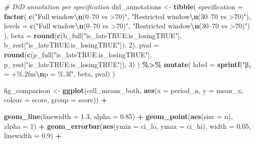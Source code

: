 \documentclass[
]{article}
\newenvironment{Shaded}{\begin{snugshade}}{\end{snugshade}}
\newcommand{\AttributeTok}[1]{\textcolor[rgb]{0.13,0.29,0.53}{#1}}
\newcommand{\CommentTok}[1]{\textcolor[rgb]{0.56,0.35,0.01}{\textit{#1}}}
\newcommand{\DecValTok}[1]{\textcolor[rgb]{0.00,0.00,0.81}{#1}}
\newcommand{\FloatTok}[1]{\textcolor[rgb]{0.00,0.00,0.81}{#1}}
\newcommand{\FunctionTok}[1]{\textcolor[rgb]{0.13,0.29,0.53}{\textbf{#1}}}
\newcommand{\NormalTok}[1]{#1}
\newcommand{\OtherTok}[1]{\textcolor[rgb]{0.56,0.35,0.01}{#1}}
\newcommand{\SpecialCharTok}[1]{\textcolor[rgb]{0.81,0.36,0.00}{\textbf{#1}}}
\newcommand{\StringTok}[1]{\textcolor[rgb]{0.31,0.60,0.02}{#1}}
\begin{document}
\begin{Shaded}
\begin{Highlighting}[]
\CommentTok{\# DiD annotation per specification}
\NormalTok{did\_annotations }\OtherTok{\textless{}{-}} \FunctionTok{tibble}\NormalTok{(}
  \AttributeTok{specification =} \FunctionTok{factor}\NormalTok{(}
    \FunctionTok{c}\NormalTok{(}\StringTok{"Full window}\SpecialCharTok{\textbackslash{}n}\StringTok{(0–70\textquotesingle{} vs \textgreater{}70\textquotesingle{})"}\NormalTok{, }\StringTok{"Restricted window}\SpecialCharTok{\textbackslash{}n}\StringTok{(30–70\textquotesingle{} vs \textgreater{}70\textquotesingle{})"}\NormalTok{),}
    \AttributeTok{levels =} \FunctionTok{c}\NormalTok{(}\StringTok{"Full window}\SpecialCharTok{\textbackslash{}n}\StringTok{(0–70\textquotesingle{} vs \textgreater{}70\textquotesingle{})"}\NormalTok{, }\StringTok{"Restricted window}\SpecialCharTok{\textbackslash{}n}\StringTok{(30–70\textquotesingle{} vs \textgreater{}70\textquotesingle{})"}\NormalTok{)}
\NormalTok{  ),}
  \AttributeTok{beta  =} \FunctionTok{round}\NormalTok{(}\FunctionTok{c}\NormalTok{(b\_full[}\StringTok{"is\_lateTRUE:is\_losingTRUE"}\NormalTok{],}
\NormalTok{                  b\_rest[}\StringTok{"is\_lateTRUE:is\_losingTRUE"}\NormalTok{]), }\DecValTok{2}\NormalTok{),}
  \AttributeTok{pval  =} \FunctionTok{round}\NormalTok{(}\FunctionTok{c}\NormalTok{(p\_full[}\StringTok{"is\_lateTRUE:is\_losingTRUE"}\NormalTok{],}
\NormalTok{                  p\_rest[}\StringTok{"is\_lateTRUE:is\_losingTRUE"}\NormalTok{]), }\DecValTok{3}\NormalTok{)}
\NormalTok{) }\SpecialCharTok{\%\textgreater{}\%}
  \FunctionTok{mutate}\NormalTok{(}
    \AttributeTok{label =} \FunctionTok{sprintf}\NormalTok{(}\StringTok{"β₃ = +\%.2fm}\SpecialCharTok{\textbackslash{}n}\StringTok{p = \%.3f"}\NormalTok{, beta, pval)}
\NormalTok{  )}

\NormalTok{fig\_comparison }\OtherTok{\textless{}{-}} \FunctionTok{ggplot}\NormalTok{(cell\_means\_both,}
       \FunctionTok{aes}\NormalTok{(}\AttributeTok{x =}\NormalTok{ period\_n, }\AttributeTok{y =}\NormalTok{ mean\_x,}
           \AttributeTok{colour =}\NormalTok{ score, }\AttributeTok{group =}\NormalTok{ score)) }\SpecialCharTok{+}

  \FunctionTok{geom\_line}\NormalTok{(}\AttributeTok{linewidth =} \FloatTok{1.3}\NormalTok{, }\AttributeTok{alpha =} \FloatTok{0.85}\NormalTok{) }\SpecialCharTok{+}
  \FunctionTok{geom\_point}\NormalTok{(}\FunctionTok{aes}\NormalTok{(}\AttributeTok{size =}\NormalTok{ n), }\AttributeTok{alpha =} \DecValTok{1}\NormalTok{) }\SpecialCharTok{+}
  \FunctionTok{geom\_errorbar}\NormalTok{(}\FunctionTok{aes}\NormalTok{(}\AttributeTok{ymin =}\NormalTok{ ci\_lo, }\AttributeTok{ymax =}\NormalTok{ ci\_hi),}
                \AttributeTok{width =} \FloatTok{0.05}\NormalTok{, }\AttributeTok{linewidth =} \FloatTok{0.9}\NormalTok{) }\SpecialCharTok{+}


\end{Highlighting}
\end{Shaded}
\end{document}
